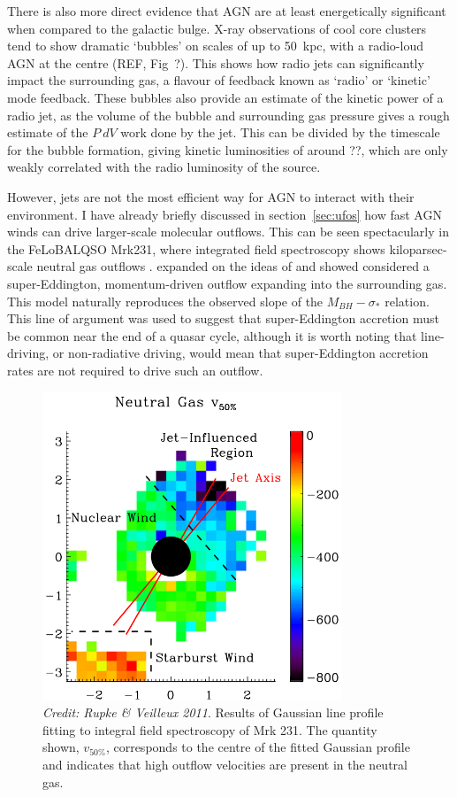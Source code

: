 There is also more direct evidence that AGN are at least energetically 
significant when compared to the galactic bulge. X-ray observations
of cool core clusters tend to show dramatic `bubbles' on scales of
up to 50~kpc, with a radio-loud AGN at the centre (REF, Fig~?). This
shows how radio jets can significantly impact the surrounding gas,
a flavour of feedback known as `radio' or `kinetic' mode feedback.
These bubbles also provide an estimate of the kinetic power of a radio
jet, as the volume of the bubble and surrounding gas pressure gives a 
rough estimate of the $P~dV$ work done by the jet. This can be divided by
the timescale for the bubble formation, giving kinetic luminosities
of around ??, which are only weakly correlated with the radio luminosity
of the source. 

However, jets are not the most efficient way for AGN to interact with 
their environment. I have already briefly discussed in section~\ref{sec:ufos}
how fast AGN winds can drive larger-scale molecular outflows.
This can be seen spectacularly in the FeLoBALQSO Mrk231, 
where integrated field spectroscopy shows kiloparsec-scale
neutral gas outflows \citep[see Fig.~\ref{fig:rupke};][]{rupke2011}.
\cite{king2003} expanded on the ideas of \cite{silkrees1998} and showed
considered a super-Eddington, momentum-driven outflow expanding into the surrounding gas. 
This model naturally reproduces the observed slope of the $M_{BH}-\sigma_*$
relation. This line of argument was used to suggest that super-Eddington accretion must be
common near the end of a quasar cycle, although it is worth noting that line-driving,
or non-radiative driving, would mean that super-Eddington accretion rates are 
not required to drive such an outflow.

\begin{figure}
\centering
\includegraphics[width=0.8\textwidth]{figures/02-outflows/rupke2.png}
\caption
{
{\sl Credit: Rupke \& Veilleux 2011}. 
Results of Gaussian line profile fitting to 
integral field spectroscopy of Mrk 231. The quantity
shown, $v_{50\%}$, corresponds to the centre of the fitted Gaussian
profile and indicates that high outflow velocities 
are present in the neutral gas.
} 
\label{fig:rupke}
\end{figure}



